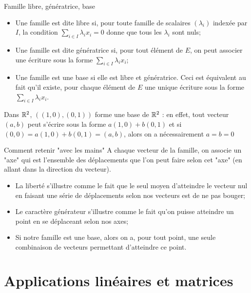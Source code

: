 \documentclass{classe}
\begin{document}
\begin{définition}{Famille libre, génératrice, base}{}
\begin{itemize}
\item Une famille est dite libre si, pour toute famille de scalaires $(\lambda_i)$ indexée par $I$, la condition $\sum_{i\in I} \lambda_i x_i = 0$ donne que tous les $\lambda_i$ sont nuls;
\item Une famille est dite génératrice si, pour tout élément de $E$, on peut associer une écriture sous la forme $\sum_{i\in I} \lambda_i x_i$;
\item Une famille est une base si elle est libre et génératrice. Ceci est équivalent au fait qu'il existe, pour chaque élément de $E$ une unique écriture sous la forme $\sum_{i\in I} \lambda_i x_i$.
\end{itemize}
\end{définition}

\begin{example}
Dans $\mathbb{R}^2$, $((1, 0),(0, 1))$ forme une base de $\mathbb{R}^2$ : en effet, tout vecteur $(a, b)$ peut s'écrire sous la forme $a(1, 0) + b(0, 1)$ et si $(0, 0) = a(1, 0) + b(0, 1) = (a, b)$, alors on a nécessairement $a=b=0$
\end{example}

\begin{remarque}{Comment retenir "avec les mains"}{}
A chaque vecteur de la famille, on associe un "axe" qui est l'ensemble des déplacements que l'on peut faire selon cet "axe" (en allant dans la direction du vecteur).
\begin{itemize}
	\item La liberté s'illustre comme le fait que le seul moyen d'atteindre le vecteur nul en faisant une série de déplacements selon nos vecteurs est de ne pas bouger;
	\item Le caractère générateur s'illustre comme le fait qu'on puisse atteindre un point en se déplaceant selon nos axes;
	\item Si notre famille est une base, alors on a, pour tout point, une seule combinaison de vecteurs permettant d'atteindre ce point.
\end{itemize}
\end{remarque}


\section{Applications linéaires et matrices}
\end{document}
